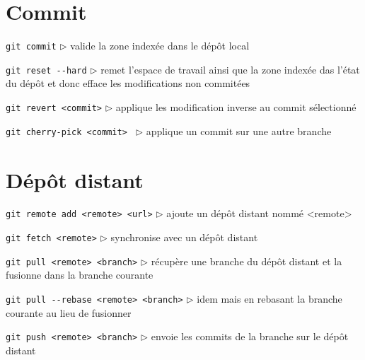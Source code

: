 \documentclass[a4paper,oneside,twocolumn]{article}
\begin{document}
\vspace{-3mm}
\section{Commit}
\vspace{-2mm}

\noindent\verb?git commit?\linebreak
$\triangleright$ valide la zone indexée dans le dépôt local


\noindent\verb?git reset --hard?\linebreak
$\triangleright$ remet l'espace de travail ainsi que la zone indexée das l'état du dépôt et donc efface les modifications non commitées

\noindent\verb?git revert <commit>?\linebreak
$\triangleright$ applique les modification inverse au commit sélectionné

\noindent\verb?git cherry-pick <commit> ?\linebreak
$\triangleright$ applique un commit sur une autre branche

\vspace{-3mm}
\section{Dépôt distant}
\vspace{-2mm}

\noindent\verb?git remote add <remote> <url>?\linebreak
$\triangleright$ ajoute un dépôt distant nommé <remote>

\noindent\verb?git fetch <remote>?\linebreak
$\triangleright$ synchronise avec un dépôt distant%

\noindent\verb?git pull <remote> <branch>?\linebreak
$\triangleright$ récupère une branche du dépôt distant et la fusionne dans la branche courante

\noindent\verb?git pull --rebase <remote> <branch>?\linebreak
$\triangleright$ idem mais en rebasant la branche courante au lieu de fusionner

\noindent\verb?git push <remote> <branch>?\linebreak
$\triangleright$ envoie les commits de la branche sur le dépôt distant
\end{document}
